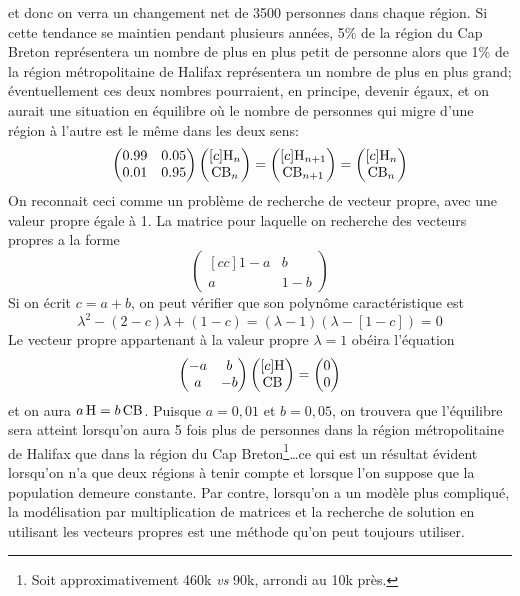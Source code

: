 et donc on verra un changement net de 3500 personnes dans chaque région.  Si cette
tendance se maintien pendant plusieurs années, 5\% de la région du Cap Breton représentera
un nombre de plus en plus petit de personne alors que 1\% de la région métropolitaine
de Halifax représentera un nombre de plus en plus grand; éventuellement ces deux nombres
pourraient, en principe, devenir égaux, et on aurait une situation en équilibre où
le nombre de personnes qui migre d'une région à l'autre est le même dans les deux sens:
\[
\begin{pmatrix}
0.99 & 0.05 \\
0.01 & 0.95
\end{pmatrix}
\begin{pmatrix}[c]
\cf{H}_n \\
\cf{CB}_n
\end{pmatrix}
=
\begin{pmatrix}[c]
\cf{H}_{n+1} \\
\cf{CB}_{n+1}
\end{pmatrix}
=
\begin{pmatrix}[c]
\cf{H}_n \\
\cf{CB}_n
\end{pmatrix}
\]
On reconnait ceci comme un problème de recherche de vecteur propre, avec une valeur propre égale à 1.
La matrice pour laquelle on recherche des vecteurs propres a la forme
\[
\begin{pmatrix}[cc]
1-a & b \\
a & 1-b
\end{pmatrix}
\]
Si on écrit $c=a+b$, on peut vérifier que son polynôme caractéristique est
\[
\lambda^2 - (2-c)\lambda + (1-c) = (\lambda -1)(\lambda -[1 - c]) = 0
\]
Le vecteur propre appartenant à la valeur propre $\lambda=1$ obéira l'équation
\[
\begin{pmatrix}
-a & b \\
a & -b
\end{pmatrix}\begin{pmatrix}[c]
\cf{H} \\ \cf{CB}
\end{pmatrix}= \begin{pmatrix}
0 \\ 0
\end{pmatrix}
\]
et on aura $a\,\cf{H} = b\, \cf{CB}$.  Puisque $a=0,01$ et $b=0,05$, on trouvera que
l'équilibre sera atteint lorsqu'on aura 5 fois plus de personnes dans la région
métropolitaine de Halifax que dans la région du Cap Breton\footnote{Soit approximativement
460k \textit{vs} 90k, arrondi au 10k près.}\ldots  ce qui
est un résultat évident lorsqu'on n'a que deux régions à tenir compte et lorsque
l'on suppose que la population demeure constante.  Par contre, lorsqu'on
a un modèle plus compliqué, la modélisation par multiplication de matrices
et la recherche de solution en utilisant les vecteurs propres est une
méthode qu'on peut toujours utiliser.

